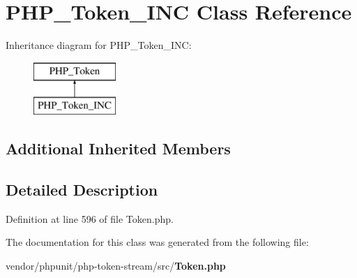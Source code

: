\section{P\+H\+P\+\_\+\+Token\+\_\+\+I\+N\+C Class Reference}
\label{class_p_h_p___token___i_n_c}
Inheritance diagram for P\+H\+P\+\_\+\+Token\+\_\+\+I\+N\+C\+:\begin{figure}[H]
\begin{center}
\leavevmode
\includegraphics[height=2.000000cm]{class_p_h_p___token___i_n_c}
\end{center}
\end{figure}
\subsection*{Additional Inherited Members}


\subsection{Detailed Description}


Definition at line 596 of file Token.\+php.



The documentation for this class was generated from the following file\+:\begin{DoxyCompactItemize}
\item 
vendor/phpunit/php-\/token-\/stream/src/{\bf Token.\+php}\end{DoxyCompactItemize}
